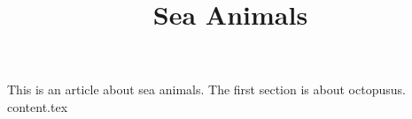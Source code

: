 \documentclass{article}
\title{Sea Animals}
\begin{document}
\maketitle
This is an article about sea animals.
The first section is about octopusus.
{content.tex}
\end{document}
